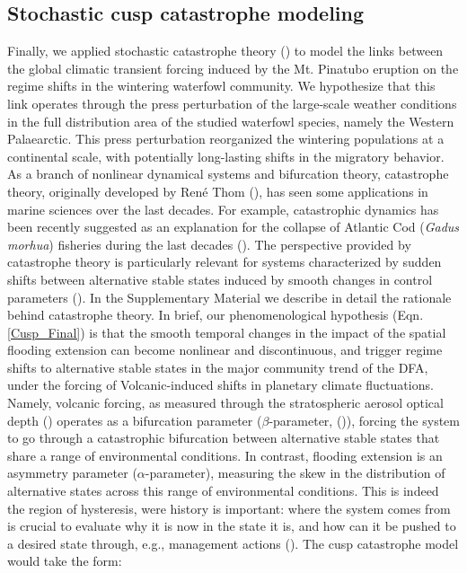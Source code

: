 \documentclass[12pt]{article}
\begin{document}
\subsection*{Stochastic cusp catastrophe modeling}
\label{subsec:Stochastic cusp catastrophe modeling}

Finally, we applied stochastic catastrophe theory (\cite{Cobb1985,Grasman2009}) to model the links between the global climatic transient forcing induced by the Mt. Pinatubo eruption on the regime shifts in the wintering waterfowl community. We hypothesize that this link operates through the press perturbation of the large-scale weather conditions in the full distribution area of the studied waterfowl species, namely the Western Palaearctic. This press perturbation reorganized the wintering populations at a continental scale, with potentially long-lasting shifts in the migratory behavior.\\

As a branch of nonlinear dynamical systems and bifurcation theory, catastrophe theory, originally developed by René Thom (\cite{Thom1975,Thom1977}), has seen some applications in marine sciences over the last decades. For example, catastrophic dynamics has been recently suggested as an explanation for the collapse of Atlantic Cod (\textit{Gadus morhua}) fisheries during the last decades (\cite{Sguotti2019}). The perspective provided by catastrophe theory is particularly relevant for systems characterized by sudden shifts between alternative stable states induced by smooth changes in control parameters (\cite{Casti1982,Loehle1989}). In the Supplementary Material we describe in detail the rationale behind catastrophe theory. In brief, our phenomenological hypothesis (Eqn. \ref{Cusp_Final}) is that the smooth temporal changes in the impact of the spatial flooding extension can become nonlinear and discontinuous, and trigger regime shifts to alternative stable states in the major community trend of the DFA, under the forcing of Volcanic-induced shifts in planetary climate fluctuations. Namely, volcanic forcing, as measured through the stratospheric aerosol optical depth (\cite{Booth2012}) operates as a bifurcation parameter ($\beta$-parameter, (\cite{Grasman2009})), forcing the system to go through a catastrophic bifurcation between alternative stable states that share a range of environmental conditions. In contrast, flooding extension is an asymmetry parameter ($\alpha$-parameter), measuring the skew in the distribution of alternative states across this range of environmental conditions. This is indeed the region of hysteresis, were history is important: where the system comes from is crucial to evaluate why it is now in the state it is, and how can it be pushed to a desired state through, e.g., management actions (\cite{Petraitis2013,Scheffer2009a,Scheffer2015a}). The cusp catastrophe model would take the form: \\
\end{document}
